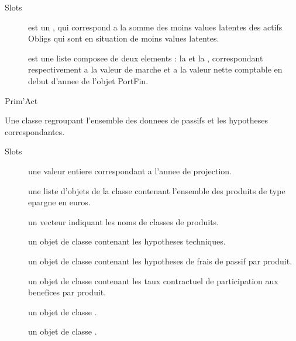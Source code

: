 \documentclass[a4paper]{book}
\begin{document}
\begin{Section}{Slots}
\begin{description}
\item[] est un , qui correspond a la somme des moins values latentes des actifs Obligs qui sont en situation de moins values latentes.

\item[] est une liste composee de deux elements : la  et la
, correspondant respectivement a la valeur de marche
et a la valeur nette comptable en debut d'annee de l'objet PortFin.

\end{description}
\end{Section}
%
\begin{Author}\relax
Prim'Act
\end{Author}
%
\begin{Description}\relax
Une classe regroupant l'ensemble des donnees de passifs et les hypotheses correspondantes.
\end{Description}
%
\begin{Section}{Slots}

\begin{description}

\item[] une valeur entiere correspondant a l'annee de projection.

\item[] une liste d'objets de la classe  contenant l'ensemble
des produits de type epargne en euros.

\item[] un vecteur  indiquant les noms de classes de produits.

\item[] un objet de classe  contenant les hypotheses techniques.

\item[] un objet de classe  contenant les hypotheses de frais de passif
par produit.

\item[] un objet de classe  contenant les taux contractuel de participation
aux benefices par produit.

\item[] un objet de classe .

\item[] un objet de classe .

\end{description}
\end{Section}
\end{document}
